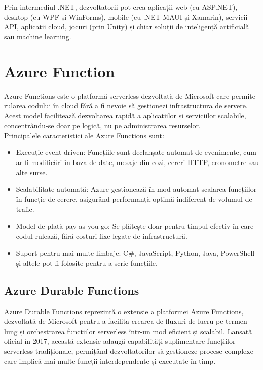 Prin intermediul .NET, dezvoltatorii pot crea aplicații web (cu ASP.NET), desktop (cu WPF și WinForms), mobile (cu .NET MAUI și Xamarin), servicii API, aplicații cloud, jocuri (prin Unity) și chiar soluții de inteligență artificială sau machine learning. \parencite{dotnet}

\section{Azure Function}
Azure Functions este o platformă serverless dezvoltată de Microsoft care permite rularea codului în cloud fără a fi nevoie să gestionezi infrastructura de servere. Acest model facilitează dezvoltarea rapidă a aplicațiilor și serviciilor scalabile, concentrându-se doar pe logică, nu pe administrarea resurselor. \parencite{azureFunctions}
\\Principalele caracteristici ale Azure Functions sunt:
\begin{itemize}
    \item Execuție event-driven: Funcțiile sunt declanșate automat de evenimente, cum ar fi modificări în baza de date, mesaje din cozi, cereri HTTP, cronometre sau alte surse.
    \item Scalabilitate automată: Azure gestionează în mod automat scalarea funcțiilor în funcție de cerere, asigurând performanță optimă indiferent de volumul de trafic.
    \item Model de plată pay-as-you-go: Se plătește doar pentru timpul efectiv în care codul rulează, fără costuri fixe legate de infrastructură.
    \item Suport pentru mai multe limbaje: C\#, JavaScript, Python, Java, PowerShell și altele pot fi folosite pentru a scrie funcțiile.
\end{itemize}\parencite{azureFunctions}

\subsection{Azure Durable Functions}
Azure Durable Functions reprezintă o extensie a platformei Azure Functions, dezvoltată de Microsoft pentru a facilita crearea de fluxuri de lucru pe termen lung și orchestrarea funcțiilor serverless într-un mod eficient și scalabil. Lansată oficial în 2017, această extensie adaugă capabilități suplimentare funcțiilor serverless tradiționale, permițând dezvoltatorilor să gestioneze procese complexe care implică mai multe funcții interdependente și executate în timp. \parencite{azureDurableFunctions}

